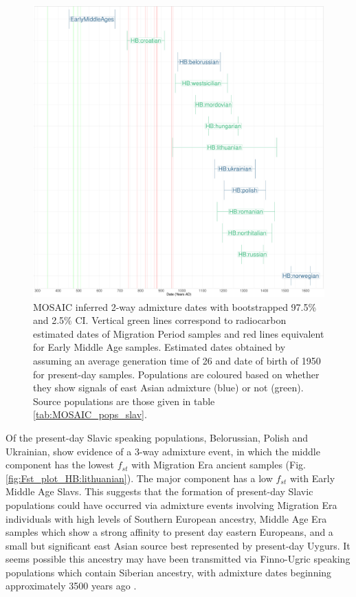 \begin{figure}[htp]
    \centering
    \includegraphics[width=1.0\textwidth]{../images/chapter5/MOSAIC_admixture_dates_plot.pdf}
    \caption{MOSAIC inferred 2-way admixture dates with bootstrapped 97.5\% and 2.5\% CI. Vertical green lines correspond to radiocarbon estimated dates of Migration Period samples and red lines equivalent for Early Middle Age samples. Estimated dates obtained by assuming an average generation time of 26 and date of birth of 1950 for present-day samples. Populations are coloured based on whether they show signals of east Asian admixture (blue) or not (green). Source populations are those given in table \ref{tab:MOSAIC_pops_slav}.}
    \label{fig:MOSAIC_admixture_dates_plot}
\end{figure} 

Of the present-day Slavic speaking populations, Belorussian, Polish and Ukrainian, show evidence of a 3-way admixture event, in which the middle component has the lowest $f_{st}$ with Migration Era ancient samples (Fig. \ref{fig:Fst_plot_HB:lithuanian}). The major component has a low $f_{st}$ with Early Middle Age Slavs. This suggests that the formation of present-day Slavic populations could have occurred via admixture events involving Migration Era individuals with high levels of Southern European ancestry, Middle Age Era samples which show a strong affinity to present day eastern Europeans, and a small but significant east Asian source best represented by present-day Uygurs. It seems possible this ancestry may have been transmitted via Finno-Ugric speaking populations which contain Siberian ancestry, with admixture dates beginning approximately 3500 years ago \cite{Lamnidis2018}.

